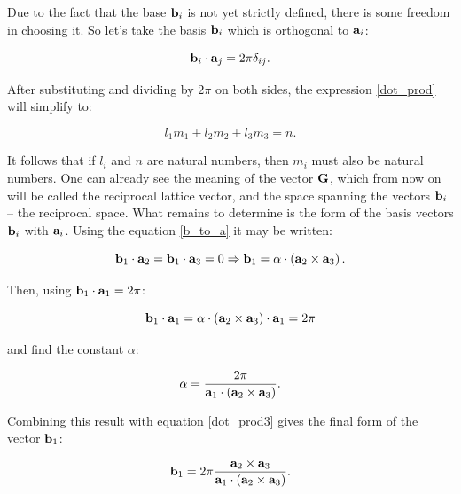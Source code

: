 Due to the fact that the base $\mathbf{b}_i$ is not yet strictly defined, there is some freedom in choosing it.
So let's take the basis $\mathbf{b}_i$ which is orthogonal to $\mathbf{a}_i$:

\begin{equation}
    \mathbf{b}_i\cdot\mathbf{a}_j=2\pi \delta_{ij}.
    \label{b_to_a}
\end{equation}

After substituting and dividing by $2\pi$ on both sides, the expression \ref{dot_prod} will simplify to:

\begin{equation}
    l_1m_1+l_2m_2+l_3m_3=n.
\end{equation}

It follows that if $l_i$ and $n$ are natural numbers, then $m_i$ must also be natural numbers.
One can already see the meaning of the vector $\mathbf{G}$, which from now on will be called the reciprocal lattice vector, and the space spanning the vectors $\mathbf{b}_i$ -- the reciprocal space.
What remains to determine is the form of the basis vectors $\mathbf{b}_i$ with $\mathbf{a}_i$.
Using the equation \ref{b_to_a} it may be written:

\begin{equation}
    \mathbf{b}_1\cdot \mathbf{a}_2=\mathbf{b}_1\cdot \mathbf{a}_3=0 \Rightarrow \mathbf{b}_1=\alpha\cdot \left(\mathbf{a}_2 \times \mathbf{a}_3\right).
    \label{dot_prod3}
\end{equation}

Then, using $\mathbf{b}_1\cdot\mathbf{a}_1=2\pi$:

\begin{equation}
    \mathbf{b}_1\cdot \mathbf{a}_1=\alpha\cdot \left(\mathbf{a}_2 \times \mathbf{a}_3\right)\cdot \mathbf{a}_1=2\pi
    \label{dot_prod4}
\end{equation}

and find the constant $\alpha$:

\begin{equation}
    \alpha =\frac{2\pi}{ \mathbf{a}_1\cdot\left(\mathbf{a}_2 \times \mathbf{a}_3\right)}.
    \label{dot_prod5}
\end{equation}

Combining this result with equation \ref{dot_prod3} gives the final form of the vector $\mathbf{b}_1$:

\begin{equation}
    \mathbf{b}_1=2\pi\frac{\mathbf{a}_2\times\mathbf{a}_3}{\mathbf{a}_1\cdot\left(\mathbf{a}_2\times\mathbf{a}_3\right)}.
    \label{recip_vectors0}
\end{equation}

